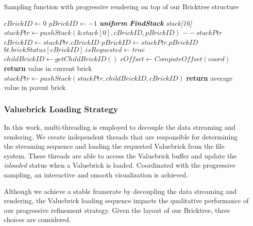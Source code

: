 \begin{algorithm}[h]
	\caption{Sampling function with progressive rendering on top of our Bricktree 
    structure}\label{alg:sample_and_stream}
	\begin{algorithmic}[1]
        	\State $cBrickID\gets \textit{0}$
            \State $pBrickID\gets \textit{$-1$}$
            \State \textit{\textbf{uniform} \textbf{FindStack} stack[16]}
            \State $stackPtr\gets pushStack(\&stack[0], cBrickID, pBrickID)$
            	\State $--stackPtr$
                	\State $cBrickID \gets stackPtr.cBrickID$
                    \State $pBrickID \gets stackPtr.pBrickID$
                    	\State $bt.brickStatus[cBrickID].isRequested \gets true$
                    \EndIf
                    \State
                		\State $childBrickID \gets getChildBrickID()$
            			\State $cOffset \gets ComputeOffset(coord)$
                			\State \textbf{return} value in current brick
               			\Else
                			\State $stackPtr\gets pushStack(stackPtr,childBrickID, cBrickID)$
                		\EndIf
                	\Else
                		\State \textbf{return} average value in parent brick
                	\EndIf
                 \EndIf
            \EndWhile
    	\EndProcedure
	\end{algorithmic}
\end{algorithm}

\subsubsection{Valuebrick Loading Strategy}
In this work, multi-threading is employed to decouple the data streaming and rendering. 
We create independent threads that are responsible for determining the streaming sequence
and loading the requested Valuebrick from the file system. These threads are able to access
the Valuebrick buffer and update the \textit{isloaded} status when a Valuebrick is loaded. 
Coordinated with the progressive sampling, an interactive and smooth visualization is achieved.

Although we achieve a stable framerate by decoupling the data streaming and rendering, the 
Valuebrick loading sequence impacts the qualitative performance of our 
progressive refinement strategy. Given the layout of our Bricktree, three choices are considered.

